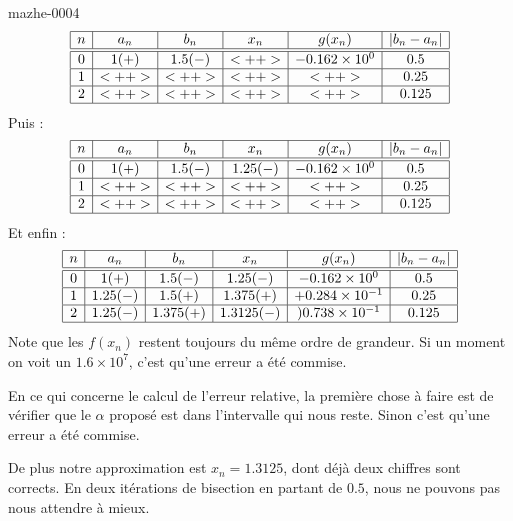 \begin{corrige}{mazhe-0004}
    \begin{equation*}
        \begin{array}[]{|c|c|c|c|c|c|}
            \hline
            n&a_n&b_n&x_n&g(x_n)&| b_n-a_n |\\
            \hline\hline
            0&1 (+)&1.5 (-)&<++>&-0.162\times 10^{0}&0.5\\
            \hline
            1&<++>&<++>&<++>&<++>&0.25\\
            \hline
            2&<++>&<++>&<++>&<++>&0.125\\
            \hline
        \end{array}
    \end{equation*}
    Puis :
    \begin{equation*}
        \begin{array}[]{|c|c|c|c|c|c|}
            \hline
            n&a_n&b_n&x_n&g(x_n)&| b_n-a_n |\\
            \hline\hline
            0&1 (+)&1.5 (-)&1.25 (-)&-0.162\times 10^{0}&0.5\\
            \hline
            1&<++>&<++>&<++>&<++>&0.25\\
            \hline
            2&<++>&<++>&<++>&<++>&0.125\\
            \hline
        \end{array}
    \end{equation*}
    Et enfin :
    \begin{equation*}
        \begin{array}[]{|c|c|c|c|c|c|}
            \hline
            n&a_n&b_n&x_n&g(x_n)&| b_n-a_n |\\
            \hline\hline
            0&1 (+)&1.5 (-)&1.25 (-)&-0.162\times 10^{0}&0.5\\
            \hline
            1&1.25 (-)&1.5(+)&1.375(+)&+0.284\times 10^{-1}&0.25\\
            \hline
            2&1.25(-)&1.375(+)&1.3125(-)&)0.738\times 10^{-1}&0.125\\
            \hline
        \end{array}
    \end{equation*}
    Note que les \( f(x_n)\) restent toujours du même ordre de grandeur. Si un moment on voit un \( 1.6\times 10^{7}\), c'est qu'une erreur a été commise.

    En ce qui concerne le calcul de l'erreur relative, la première chose à faire est de vérifier que le \( \alpha\) proposé est dans l'intervalle qui nous reste. Sinon c'est qu'une erreur a été commise.

    De plus notre approximation est \( x_n=1.3125\), dont déjà deux chiffres sont corrects. En deux itérations de bisection en partant de \( 0.5\), nous ne pouvons pas nous attendre à mieux.

\end{corrige}
